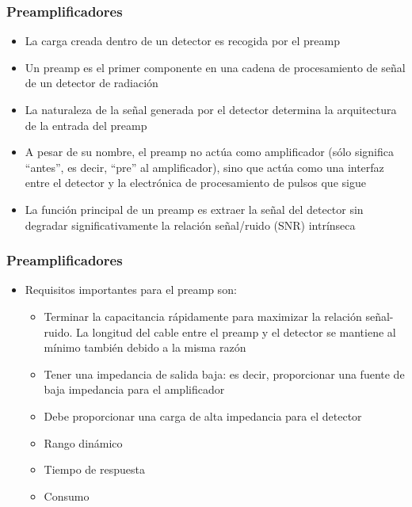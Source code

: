 \documentclass{beamer}
\begin{document}
\begin{frame}
  \begin{center}
    \Huge{\color{blue}{Amplificación de señales}}
  \end{center}
\end{frame}

\begin{frame}
\frametitle{Preamplificadores}
\begin{itemize}
\item La carga creada dentro de un detector es recogida por el preamp
\item Un preamp es el primer componente en una cadena de procesamiento de
señal de un detector de radiación
\item La naturaleza de la señal generada por el detector \alert{determina la
arquitectura de la entrada} del preamp
\item A pesar de su nombre, el preamp no actúa como amplificador (sólo
significa ``antes'', es decir, ``pre'' al amplificador), sino que actúa como una
interfaz entre el detector y la electrónica de procesamiento de pulsos que sigue 
\item La función principal de un preamp es extraer la señal del detector
{\color{blue}sin degradar significativamente la relación señal/ruido (SNR)
intrínseca}
\end{itemize}
\end{frame}

\begin{frame}
\frametitle{Preamplificadores}
\begin{itemize}
\item Requisitos importantes para el preamp son:
\begin{itemize}
\item Terminar la capacitancia rápidamente para maximizar la relación
señal-ruido. La longitud del cable entre el preamp y el detector se mantiene al
mínimo también debido a la misma razón
\item Tener una impedancia de salida baja: es decir, proporcionar una fuente de baja
impedancia para el amplificador
\item Debe proporcionar una carga de alta impedancia para el detector
\item Rango dinámico
\item Tiempo de respuesta
\item Consumo
\end{itemize}
\end{itemize}
\end{frame}
\end{document}
